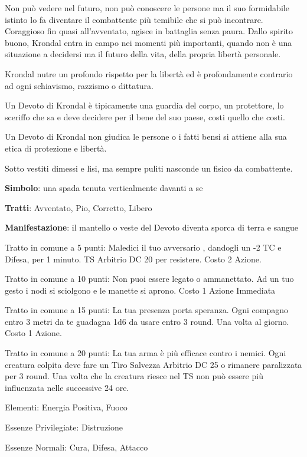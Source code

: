 \documentclass[a4paper,11pt,twoside,openany]{book}
\begin{document}
Non può vedere nel futuro, non può conoscere le persone ma il suo formidabile istinto lo fa diventare il combattente più temibile che si può incontrare. Coraggioso fin quasi all'avventato, agisce in battaglia senza paura. Dallo spirito buono, Krondal entra in campo nei momenti più importanti, quando non è una situazione a decidersi ma il futuro della vita, della propria libertà personale.

Krondal nutre un profondo rispetto per la libertà ed è profondamente contrario ad ogni schiavismo, razzismo o dittatura.

Un Devoto di Krondal è tipicamente una guardia del corpo, un protettore, lo sceriffo che sa e deve decidere per il bene del suo paese, costi quello che costi.

Un Devoto di Krondal non giudica le persone o i fatti bensi si attiene alla sua etica di protezione e libertà.

Sotto vestiti dimessi e lisi, ma sempre puliti nasconde un fisico da combattente.

\textbf{Simbolo}: una spada tenuta verticalmente davanti a se

\textbf{Tratti}: Avventato, Pio, Corretto, Libero

\textbf{Manifestazione}: il mantello o veste del Devoto diventa sporca di terra e sangue

\bigskip

Tratto in comune a 5 punti: Maledici il tuo avversario , dandogli un -2 TC e Difesa, per 1 minuto. TS Arbitrio DC 20 per resistere. Costo 2 Azione.

Tratto in comune a 10 punti: Non puoi essere legato o ammanettato. Ad un tuo gesto i nodi si sciolgono e le manette si aprono. Costo 1 Azione Immediata

Tratto in comune a 15 punti: La tua presenza porta speranza. Ogni compagno entro 3 metri da te guadagna 1d6 da usare entro 3 round. Una volta al giorno. Costo 1 Azione.

Tratto in comune a 20 punti: La tua arma è più efficace contro i nemici. Ogni creatura colpita deve fare un Tiro Salvezza Arbitrio DC 25 o rimanere paralizzata per 3 round. Una volta che la creatura riesce nel TS non può essere più influenzata nelle successive 24 ore.

\bigskip

Elementi: Energia Positiva, Fuoco

\bigskip

Essenze Privilegiate: Distruzione

Essenze Normali: Cura, Difesa, Attacco
\end{document}
